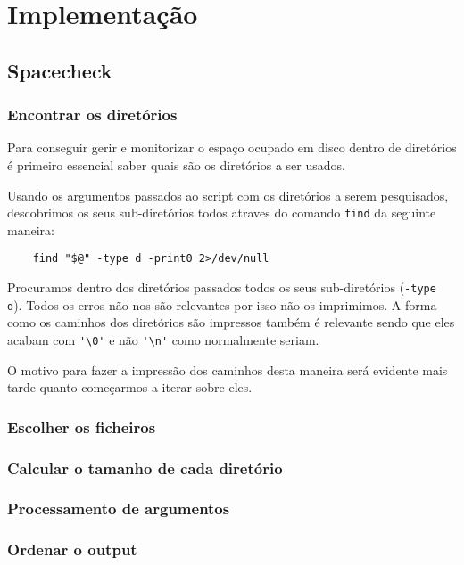 \chapter{Implementação}

\section{Spacecheck}

\subsection{Encontrar os diretórios}

Para conseguir gerir e monitorizar o espaço ocupado em disco dentro de
diretórios é primeiro essencial saber quais são os diretórios a ser usados.

Usando os argumentos passados ao script com os diretórios a serem pesquisados,
descobrimos os seus sub-diretórios todos atraves do comando
\texttt{find} da seguinte maneira:
\begin{listing}[H]
  \begin{verbatim}
    find "$@" -type d -print0 2>/dev/null
  \end{verbatim}
\end{listing}
Procuramos dentro dos diretórios passados todos os seus sub-diretórios
(\texttt{-type d}). Todos os erros não nos são relevantes por isso
não os imprimimos. A forma como os caminhos dos diretórios são impressos também
é relevante sendo que eles acabam com \Verb|'\0'| e não \Verb|'\n'| como normalmente
seriam.

O motivo para fazer a impressão dos caminhos desta maneira será evidente mais
tarde quanto começarmos a iterar sobre eles.

\subsection{Escolher os ficheiros}

\subsection{Calcular o tamanho de cada diretório}

\subsection{Processamento de argumentos}

\subsection{Ordenar o output}


